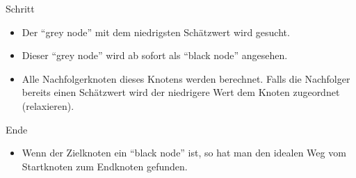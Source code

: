 \begin{frame}
	\begin{block}{Schritt}
		\begin{itemize}
			\item<2-> Der ``grey node'' mit dem niedrigsten Schätzwert wird gesucht.
			\item<3-> Dieser ``grey node'' wird ab sofort als ``black node'' angesehen.
			\item<4-> Alle Nachfolgerknoten dieses Knotens werden berechnet. Falls die Nachfolger bereits einen Schätzwert wird der niedrigere Wert dem Knoten zugeordnet (relaxieren).
		\end{itemize}
	\end{block}
\end{frame}

\begin{frame}
	\begin{block}{Ende}
		\begin{itemize}
			\item<2-> Wenn der Zielknoten ein ``black node'' ist, so hat man den idealen Weg vom Startknoten zum Endknoten gefunden.
		\end{itemize}
	\end{block}
\end{frame}